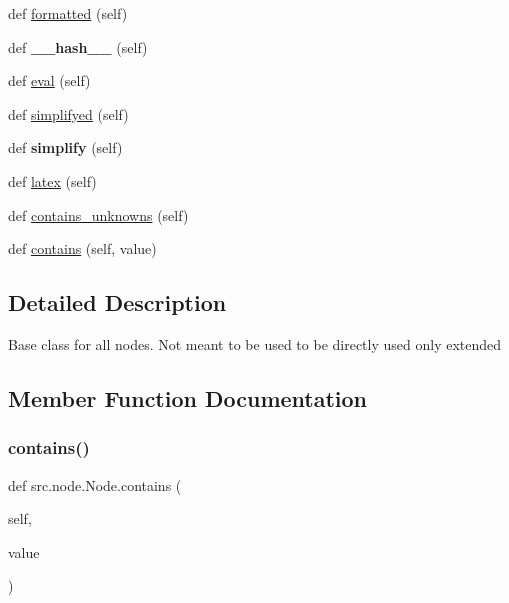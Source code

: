 \begin{DoxyCompactItemize}
\item 
def \mbox{\hyperlink{classsrc_1_1node_1_1Node_ab8922015ef650c8c490bd57bb247cdb3}{formatted}} (self)
\item 
\mbox{\label{classsrc_1_1node_1_1Node_ad67a6d5e78b7221fb36d43b1e32f8abb}} 
def {\bfseries \+\_\+\+\_\+hash\+\_\+\+\_\+} (self)
\item 
def \mbox{\hyperlink{classsrc_1_1node_1_1Node_af95402801ea0022078ff5adb2f21bcf4}{eval}} (self)
\item 
def \mbox{\hyperlink{classsrc_1_1node_1_1Node_a78a051abb54de2b49a557c780d53c05b}{simplifyed}} (self)
\item 
\mbox{\label{classsrc_1_1node_1_1Node_ac2692decc5f1f31c630b33032ccda24d}} 
def {\bfseries simplify} (self)
\item 
def \mbox{\hyperlink{classsrc_1_1node_1_1Node_a96e5e408dd0bcca509adb992b3896010}{latex}} (self)
\item 
def \mbox{\hyperlink{classsrc_1_1node_1_1Node_a08d924ae213016952cc4a520a961d945}{contains\+\_\+unknowns}} (self)
\item 
def \mbox{\hyperlink{classsrc_1_1node_1_1Node_aca2d7597667efc35f903fd455cb1c5fb}{contains}} (self, value)
\end{DoxyCompactItemize}


\subsection{Detailed Description}
\begin{DoxyVerb}Base class for all nodes. Not meant to be used to be directly used only extended
\end{DoxyVerb}
 

\subsection{Member Function Documentation}
\mbox{\label{classsrc_1_1node_1_1Node_aca2d7597667efc35f903fd455cb1c5fb}} 
\subsubsection{\texorpdfstring{contains()}{contains()}}
{\footnotesize\ttfamily def src.\+node.\+Node.\+contains (\begin{DoxyParamCaption}\item[{}]{self,  }\item[{}]{value }\end{DoxyParamCaption})}

